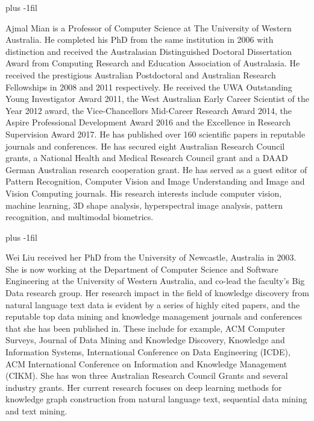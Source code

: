 \documentclass[10pt,journal,compsoc]{IEEEtran}
\begin{document}
\vspace{-6mm}
\vskip 0pt plus -1fil
\begin{IEEEbiography}
{Ajmal Mian} is a Professor of Computer Science at The University of Western Australia. He completed his PhD from the same institution in 2006 with distinction and received the Australasian Distinguished Doctoral Dissertation Award from Computing Research and Education Association of Australasia. He received the prestigious Australian Postdoctoral and Australian Research Fellowships in 2008 and 2011 respectively. He received the UWA Outstanding Young Investigator Award 2011, the West Australian Early Career Scientist of the Year 2012 award, the Vice-Chancellors Mid-Career Research Award 2014, the Aspire Professional Development Award 2016 and the Excellence in Research Supervision Award 2017. He has published over 160 scientific papers in reputable journals and conferences. He has secured eight Australian Research Council grants, a National Health and Medical Research Council grant and a DAAD German Australian research cooperation grant. He has served as a guest editor of Pattern Recognition, Computer Vision and Image Understanding and Image and Vision Computing journals. His research interests include computer vision, machine learning, 3D shape analysis, hyperspectral image analysis, pattern recognition, and multimodal biometrics.
\end{IEEEbiography}
\vskip 0pt plus -1fil
\begin{IEEEbiography}
{Wei Liu} received her PhD from the University of Newcastle, Australia in 2003. She is now working at the Department of Computer Science and Software Engineering at the University of Western Australia, and co-lead the faculty's Big Data research group. Her research impact in the field of knowledge discovery from natural language text data is evident by a series of highly cited papers, and the reputable top data mining and knowledge management journals and conferences that she has been published in. These include for example, ACM Computer Surveys, Journal of Data Mining and Knowledge Discovery, Knowledge and Information Systems, International Conference on Data Engineering (ICDE), ACM International Conference on Information and Knowledge Management (CIKM). She has won three Australian Research Council Grants and several industry grants. Her current research focuses on deep learning methods for knowledge graph construction from natural language text, sequential data mining and text mining. 
\end{IEEEbiography}
\end{document}
